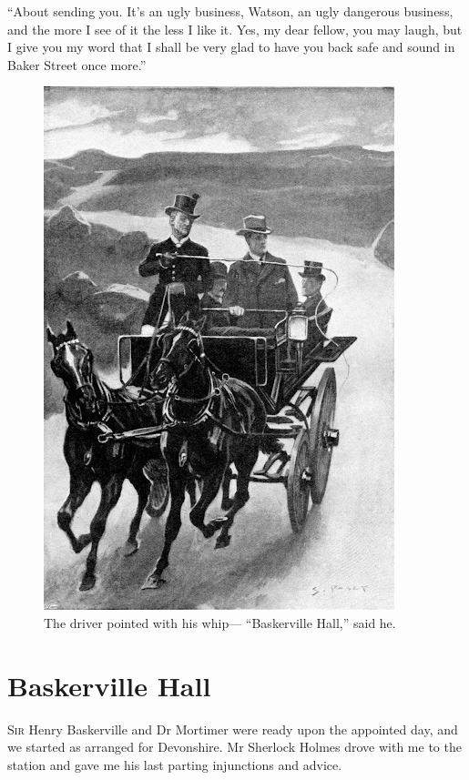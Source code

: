 \documentclass[paper=5.5in:8.5in,BCOR=7mm,twoside,DIV=calc,12pt,usegeometry,openany,chapterprefix,endperiod,headings=big]{scrbook} %
\begin{document}
\enquote{About sending you. It's an ugly business, Watson, an ugly dangerous business, and the more I see of it the less I like it. Yes, my dear fellow, you may laugh, but I give you my word that I shall be very glad to have you back safe and sound in Baker Street once more.}
\clearpage
\vfill
\begin{figure}[hp!]
\centering
\includegraphics[width=\textwidth]{06_driverwhip}
\caption{The driver pointed with his whip--- \enquote{Baskerville Hall,} said he.}
\end{figure}
\vfill
\thispagestyle{empty}
\clearpage

\chapter{Baskerville Hall}
\lettrine[lines=1]{S}{ir} Henry Baskerville and Dr Mortimer were ready upon the appointed day, and we started as arranged for Devonshire. Mr Sherlock Holmes drove with me to the station and gave me his last parting injunctions and advice.
\end{document}
